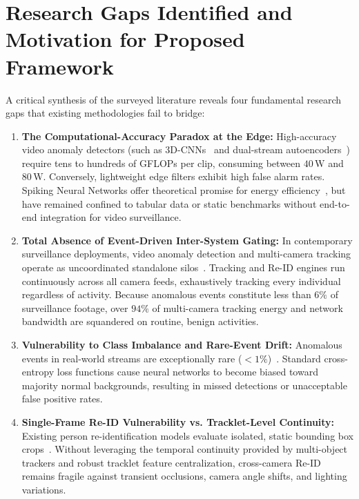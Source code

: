 \documentclass[12pt,a4paper]{report}
\begin{document}
\section{Research Gaps Identified and Motivation for Proposed Framework}
A critical synthesis of the surveyed literature reveals four fundamental research gaps that existing methodologies fail to bridge:
\begin{enumerate}
    \item \textbf{The Computational-Accuracy Paradox at the Edge:} High-accuracy video anomaly detectors (such as 3D-CNNs~\cite{ref_sultani2018_ucfcrime,ref_elmetwally2024_i3d} and dual-stream autoencoders~\cite{ref_ye2024_krfe}) require tens to hundreds of GFLOPs per clip, consuming between $40\,\text{W}$ and $80\,\text{W}$. Conversely, lightweight edge filters exhibit high false alarm rates. Spiking Neural Networks offer theoretical promise for energy efficiency~\cite{ref_xie2024_csnn,ref_bassler2022_esnn,ref_plesa2024_snp}, but have remained confined to tabular data or static benchmarks without end-to-end integration for video surveillance.
    \item \textbf{Total Absence of Event-Driven Inter-System Gating:} In contemporary surveillance deployments, video anomaly detection and multi-camera tracking operate as uncoordinated standalone silos~\cite{ref_zhang2022_bytetrack,ref_zhou2021_osnet_ain}. Tracking and Re-ID engines run continuously across all camera feeds, exhaustively tracking every individual regardless of activity. Because anomalous events constitute less than $6\%$ of surveillance footage, over $94\%$ of multi-camera tracking energy and network bandwidth are squandered on routine, benign activities.
    \item \textbf{Vulnerability to Class Imbalance and Rare-Event Drift:} Anomalous events in real-world streams are exceptionally rare ($<1\%$)~\cite{ref_pimsarn2022_imbalance,ref_raman2021_ics}. Standard cross-entropy loss functions cause neural networks to become biased toward majority normal backgrounds, resulting in missed detections or unacceptable false positive rates.
    \item \textbf{Single-Frame Re-ID Vulnerability vs. Tracklet-Level Continuity:} Existing person re-identification models evaluate isolated, static bounding box crops~\cite{ref_hermans2017_triplet,ref_zhou2019_osnet}. Without leveraging the temporal continuity provided by multi-object trackers and robust tracklet feature centralization, cross-camera Re-ID remains fragile against transient occlusions, camera angle shifts, and lighting variations.
\end{enumerate}
\end{document}
